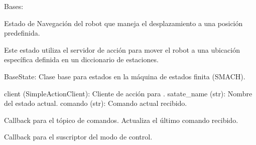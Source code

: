 \documentclass[a4paper,10pt,spanish]{sphinxmanual}
\begin{document}
\begin{fulllineitems}
\label{\detokenize{squad_state_manager:squad_state_manager.EstadoNavegacion}}
\pysigstartsignatures
{}
\pysigstopsignatures
\sphinxAtStartPar
Bases: {\hyperref[\detokenize{squad_state_manager:squad_state_manager.BaseState}]{}}

\sphinxAtStartPar
Estado de Navegación del robot que maneja el desplazamiento a una posición predefinida.

\sphinxAtStartPar
Este estado utiliza el servidor de acción  para mover el robot a una ubicación específica
definida en un diccionario de estaciones.
\begin{description}
\sphinxAtStartPar
BaseState: Clase base para estados en la máquina de estados finita (SMACH).

\sphinxAtStartPar
client (SimpleActionClient): Cliente de acción para .
satate\_name (str): Nombre del estado actual.
comando (str): Comando actual recibido.

\end{description}

\begin{fulllineitems}
\label{\detokenize{squad_state_manager:squad_state_manager.EstadoNavegacion.command_callback}}
\pysigstartsignatures
{}
\pysigstopsignatures
\sphinxAtStartPar
Callback para el tópico de comandos. Actualiza el último comando recibido.

\end{fulllineitems}


\begin{fulllineitems}
\label{\detokenize{squad_state_manager:squad_state_manager.EstadoNavegacion.control_mode_callback}}
\pysigstartsignatures
{}
\pysigstopsignatures
\sphinxAtStartPar
Callback para el suscriptor del modo de control.


\end{fulllineitems}
\end{fulllineitems}
\end{document}
